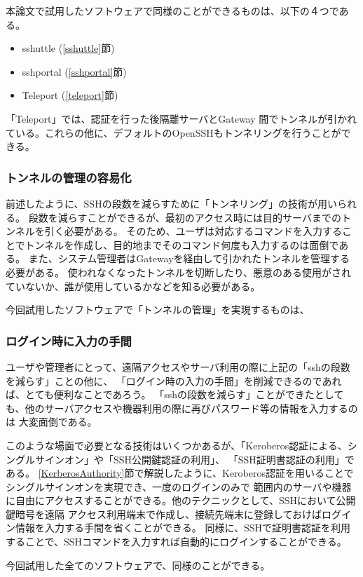 \documentclass[11pt,a4j,titlepage]{jreport}
\begin{document}
\par 本論文で試用したソフトウェアで同様のことができるものは、以下の４つである。
\begin{itemize}
    \item sshuttle (\ref{sshuttle}節)
    \item sshportal (\ref{sshportal}節)
    \item Teleport (\ref{teleport}節)
\end{itemize}
「Teleport」では、認証を行った後隔離サーバとGateway
間でトンネルが引かれている。これらの他に、デフォルトのOpenSSHもトンネリングを行うことができる。


\subsubsection*{トンネルの管理の容易化}
前述したように、SSHの段数を減らすために「トンネリング」の技術が用いられる。
段数を減らすことができるが、最初のアクセス時には目的サーバまでのトンネルを引く必要がある。
そのため、ユーザは対応するコマンドを入力することでトンネルを作成し、目的地までそのコマンド何度も入力するのは面倒である。
また、システム管理者はGatewayを経由して引かれたトンネルを管理する必要がある。
使われなくなったトンネルを切断したり、悪意のある使用がされていないか、誰が使用しているかなどを知る必要がある。

今回試用したソフトウェアで「トンネルの管理」を実現するものは、


\subsubsection*{ログイン時に入力の手間}
ユーザや管理者にとって、遠隔アクセスやサーバ利用の際に上記の「sshの段数を減らす」ことの他に、
「ログイン時の入力の手間」を削減できるのであれば、とても便利なことであろう。
「sshの段数を減らす」ことができたとしても、他のサーバアクセスや機器利用の際に再びパスワード等の情報を入力するのは
大変面倒である。

このような場面で必要となる技術はいくつかあるが、「Keroberos認証による、シングルサインオン」や「SSH公開鍵認証の利用」、
「SSH証明書認証の利用」である。
\ref{KerberosAuthority}節で解説したように、Keroberos認証を用いることでシングルサインオンを実現でき、一度のログインのみで
範囲内のサーバや機器に自由にアクセスすることができる。他のテクニックとして、SSHにおいて公開鍵暗号を遠隔
アクセス利用端末で作成し、接続先端末に登録しておけばログイン情報を入力する手間を省くことができる。
同様に、SSHで証明書認証を利用することで、SSHコマンドを入力すれば自動的にログインすることができる。
\par 今回試用した全てのソフトウェアで、同様のことができる。
\end{document}

